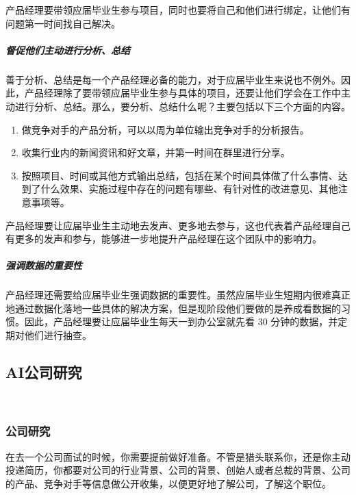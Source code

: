 \documentclass[letterpaper,10pt,english]{sphinxmanual}
\begin{document}
产品经理要带领应届毕业生参与项目，同时也要将自己和他们进行绑定，让他们有问题第一时间找自己解决。


\subparagraph{督促他们主动进行分析、总结}
\label{\detokenize{chapter_AI_dive/develop:id8}}
善于分析、总结是每一个产品经理必备的能力，对于应届毕业生来说也不例外。因此，产品经理除了要带领应届毕业生参与具体的项目，还要让他们学会在工作中主动进行分析、总结。那么，要分析、总结什么呢？主要包括以下三个方面的内容。
\begin{enumerate}
%
\item {} 
做竞争对手的产品分析，可以以周为单位输出竞争对手的分析报告。

\item {} 
收集行业内的新闻资讯和好文章，并第一时间在群里进行分享。

\item {} 
按照项目、时间或其他方式输出总结，包括在某个时间具体做了什么事情、达到了什么效果、实施过程中存在的问题有哪些、有针对性的改进意见、其他注意事项等。

\end{enumerate}

产品经理要让应届毕业生主动地去发声、更多地去参与，这也代表着产品经理自己有更多的发声和参与，能够进一步地提升产品经理在这个团队中的影响力。


\subparagraph{强调数据的重要性}
\label{\detokenize{chapter_AI_dive/develop:id9}}
产品经理还需要给应届毕业生强调数据的重要性。虽然应届毕业生短期内很难真正地通过数据化落地一些具体的解决方案，但是现阶段他们要做的是养成看数据的习惯。因此，产品经理要让应届毕业生每天一到办公室就先看
30 分钟的数据，并定期对他们进行抽查。


\subsection{AI公司研究}
\label{\detokenize{chapter_AI_company/index:ai}}\label{\detokenize{chapter_AI_company/index:chap-company}}\label{\detokenize{chapter_AI_company/index::doc}}
​


\subsubsection{公司研究}
\label{\detokenize{chapter_AI_company/company_research:id1}}\label{\detokenize{chapter_AI_company/company_research::doc}}
在去一个公司面试的时候，你需要提前做好准备。不管是猎头联系你，还是你主动投递简历，你都要对公司的行业背景、公司的背景、创始人或者总裁的背景、公司的产品、竞争对手等信息做公开收集，以便更好地了解公司，了解这个职位。
\end{document}
